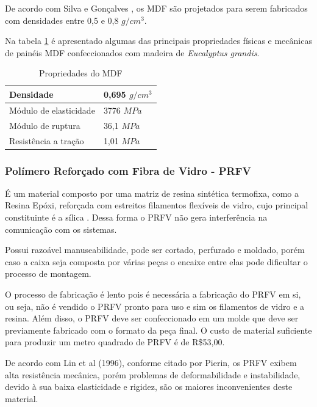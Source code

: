     \par De acordo com Silva e Gonçalves \cite{da2007avaliaccao}, os MDF são projetados para serem fabricados com densidades entre 0,5 e 0,8 $g/cm^3$. 
    
    \par Na tabela \ref{tab:mdf} é apresentado algumas das principais propriedades físicas e mecânicas de painéis MDF confeccionados com madeira de \textit{Eucalyptus grandis}. \cite{propriedades_mdf}
    
\begin{table}[h]
\centering
\begin{tabular}{|l|l|}
\hline
Densidade              & 0,695 $g/cm^3$ \\ \hline
Módulo de elasticidade & 3776 $MPa$ \\ \hline
Módulo de ruptura      & 36,1 $MPa$ \\ \hline
Resistência a tração   & 1,01 $MPa$ \\ \hline
\end{tabular}
\caption{Propriedades do MDF}
\label{tab:mdf}
\end{table}

\subsubsection{Polímero Reforçado com Fibra de Vidro - PRFV}
    
    \par É um material composto por uma matriz de resina sintética termofixa, como a Resina Epóxi, reforçada com estreitos filamentos flexíveis de vidro, cujo principal constituinte é a sílica \cite{pierin2005estudo}. Dessa forma o PRFV não gera interferência na comunicação com os sistemas. 
    
    \par Possui razoável manuseabilidade, pode ser cortado, perfurado e moldado, porém caso a caixa seja composta por várias peças o encaixe entre elas pode dificultar o processo de montagem.    
    
    \par O processo de fabricação é lento pois é necessária a fabricação do PRFV em si, ou seja, não é vendido o PRFV pronto para uso e sim os filamentos de vidro e a resina. Além disso, o PRFV deve ser confeccionado em um molde que deve ser previamente fabricado com o formato da peça final. O custo de material suficiente para produzir um metro quadrado de PRFV é de R\$53,00.  
    
    \par De acordo com Lin et al (1996), conforme citado por Pierin, os PRFV exibem alta resistência mecânica, porém problemas de deformabilidade e instabilidade, devido à sua baixa elasticidade e rigidez, são os maiores inconvenientes deste material. \cite{pierin2005estudo}
    
